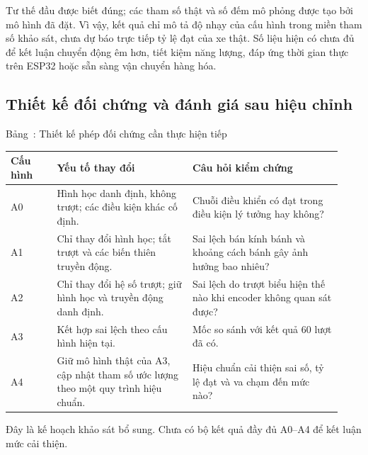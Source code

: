 \documentclass[12pt,a4paper,oneside]{report}
\renewcommand{\tablename}{Bảng}
\begin{document}
Tư thế đầu được biết đúng; các tham số thật và số đếm mô phỏng được tạo bởi mô hình đã đặt. Vì vậy, kết quả chỉ mô tả độ nhạy của cấu hình trong miền tham số khảo sát, chưa dự báo trực tiếp tỷ lệ đạt của xe thật. Số liệu hiện có chưa đủ để kết luận chuyển động êm hơn, tiết kiệm năng lượng, đáp ứng thời gian thực trên ESP32 hoặc sẵn sàng vận chuyển hàng hóa.

\subsection{Thiết kế đối chứng và đánh giá sau hiệu chỉnh}

\begin{center}
\begin{minipage}{\linewidth}
  \centering
  \label{tab:c4-ablation}
  \tablename~\thetable: Thiết kế phép đối chứng cần thực hiện tiếp\par\smallskip
  \small\singlespacing
  \renewcommand{\arraystretch}{1.22}
  \begin{tabular}{@{}>{\raggedright\arraybackslash}p{0.13\linewidth}>{\raggedright\arraybackslash}p{0.38\linewidth}>{\raggedright\arraybackslash}p{0.42\linewidth}@{}}
    \toprule
    \textbf{Cấu hình} & \textbf{Yếu tố thay đổi} & \textbf{Câu hỏi kiểm chứng}\\
    \midrule
    A0 & Hình học danh định, không trượt; các điều kiện khác cố định. & Chuỗi điều khiển có đạt trong điều kiện lý tưởng hay không?\\
    A1 & Chỉ thay đổi hình học; tắt trượt và các biến thiên truyền động. & Sai lệch bán kính bánh và khoảng cách bánh gây ảnh hưởng bao nhiêu?\\
    A2 & Chỉ thay đổi hệ số trượt; giữ hình học và truyền động danh định. & Sai lệch do trượt biểu hiện thế nào khi encoder không quan sát được?\\
    A3 & Kết hợp sai lệch theo cấu hình hiện tại. & Mốc so sánh với kết quả 60 lượt đã có.\\
    A4 & Giữ mô hình thật của A3, cập nhật tham số ước lượng theo một quy trình hiệu chuẩn. & Hiệu chuẩn cải thiện sai số, tỷ lệ đạt và va chạm đến mức nào?\\
    \bottomrule
  \end{tabular}
  \par\smallskip\begin{minipage}{0.97\linewidth}\footnotesize Đây là kế hoạch khảo sát bổ sung. Chưa có bộ kết quả đầy đủ A0--A4 để kết luận mức cải thiện.\end{minipage}
\end{minipage}
\end{center}
\end{document}
